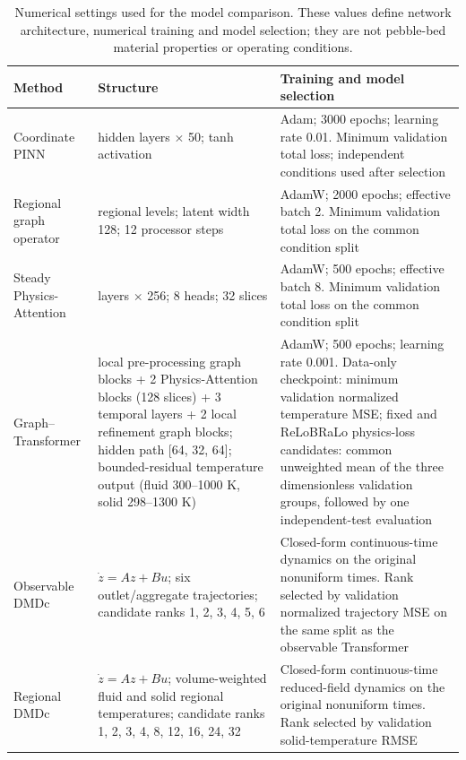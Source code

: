 \begin{table}[htbp]
\centering
\scriptsize
\renewcommand{\arraystretch}{0.90}
\setlength{\tabcolsep}{3pt}
\caption{Numerical settings used for the model comparison. These values define network architecture, numerical training and model selection; they are not pebble-bed material properties or operating conditions.}
\label{tab:model_settings}
\begin{tabular}{>{\raggedright\arraybackslash}p{2.4cm}>{\raggedright\arraybackslash}p{5.2cm}>{\raggedright\arraybackslash}p{5.0cm}}
\toprule
Method & Structure & Training and model selection \\
\midrule
Coordinate PINN \cite{raissi2019pinn,li2024pino,wang2024hccb_pinn} & 6 hidden layers $\times$ 50; tanh activation & Adam; 3000 epochs; learning rate 0.01. Minimum validation total loss; independent conditions used after selection \\
Regional graph operator \cite{mousavi2025rigno} & 6 regional levels; latent width 128; 12 processor steps & AdamW; 2000 epochs; effective batch 2. Minimum validation total loss on the common condition split \\
Steady Physics-Attention \cite{wu2024transolver} & 5 layers $\times$ 256; 8 heads; 32 slices & AdamW; 500 epochs; effective batch 8. Minimum validation total loss on the common condition split \\
Graph--Transformer \cite{pfaff2021meshgraphnets,mousavi2025rigno,wu2024transolver,vaswani2017attention,iparraguirre2026mgnt} & 2 local pre-processing graph blocks + 2 Physics-Attention blocks (128 slices) + 3 temporal layers + 2 local refinement graph blocks; hidden path [64, 32, 64]; bounded-residual temperature output (fluid 300--1000 K, solid 298--1300 K) & AdamW; 500 epochs; learning rate 0.001. Data-only checkpoint: minimum validation normalized temperature MSE; fixed and ReLoBRaLo physics-loss candidates: common unweighted mean of the three dimensionless validation groups, followed by one independent-test evaluation \\
Observable DMDc \cite{proctor2016dmdc} & $\dot z=Az+Bu$; six outlet/aggregate trajectories; candidate ranks 1, 2, 3, 4, 5, 6 & Closed-form continuous-time dynamics on the original nonuniform times. Rank selected by validation normalized trajectory MSE on the same split as the observable Transformer \\
Regional DMDc \cite{proctor2016dmdc} & $\dot z=Az+Bu$; volume-weighted fluid and solid regional temperatures; candidate ranks 1, 2, 3, 4, 8, 12, 16, 24, 32 & Closed-form continuous-time reduced-field dynamics on the original nonuniform times. Rank selected by validation solid-temperature RMSE \\

\end{tabular}
\end{table}
